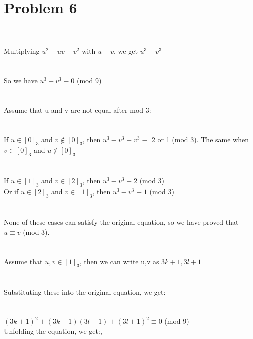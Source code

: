 \documentclass{article}
\begin{document}
\section{Problem 6}
\\ \hspace*{\fill} \\
Multiplying $u^2+uv+v^2$ with $u-v$, we get $u^3-v^3$\\
\\ \hspace*{\fill} \\
So we have $u^3-v^3 \equiv 0$ (mod 9)\\
\\ \hspace*{\fill} \\
Assume that u and v are not equal after mod 3:\\
\\ \hspace*{\fill} \\
If $u \in [0]_3$ and $v \notin [0]_3$, then $u^3-v^3 \equiv v^3 \equiv $ 2 or 1 (mod 3). The same when $v \in [0]_3$ and $u \notin [0]_3$\\
\\ \hspace*{\fill} \\
If $u \in [1]_3$ and $v \in [2]_3$, then $u^3-v^3 \equiv 2$ (mod 3)\\
Or if $u \in [2]_3$ and $v \in [1]_3$, then $u^3-v^3 \equiv 1$ (mod 3)\\
\\ \hspace*{\fill} \\
None of these cases can satisfy the original equation, so we have proved that $u \equiv v$ (mod 3).\\
\\ \hspace*{\fill} \\
Assume that $u,v \in [1]_3$, then we can write u,v as $3k+1,3l+1$\\
\\ \hspace*{\fill} \\
Substituting these into the original equation, we get:\\
\\ \hspace*{\fill} \\
$(3k+1)^2+(3k+1)(3l+1)+(3l+1)^2 \equiv 0$ (mod 9)\\
Unfolding the equation, we get:, 
\\ \hspace*{\fill} \\
\end{document}

